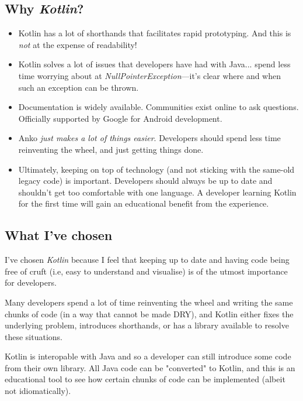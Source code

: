 \documentclass[a4paper]{article}
\begin{document}
\subsection{Why \emph{Kotlin}?}
\begin{itemize}
    \item Kotlin has a lot of shorthands that facilitates rapid prototyping. And this is \emph{not} at the expense of readability!\cite{whykotlin}
    \item Kotlin solves a lot of issues that developers have had with Java... spend less time worrying about at \emph{NullPointerException}---it's clear where and when such an exception can be thrown.
    \item Documentation is widely available. Communities exist online\cite{kotlincommunity} to ask questions. Officially supported by Google for Android development.
    \item Anko \emph{just makes a lot of things easier}. Developers should spend less time reinventing the wheel, and just getting things done.
    \item Ultimately, keeping on top of technology (and not sticking with the same-old legacy code) is important. Developers should always be up to date and shouldn't get too comfortable with one language. A developer learning Kotlin for the first time will gain an educational benefit from the experience.
\end{itemize}

\subsection{What I've chosen}
I've chosen \emph{Kotlin} because I feel that keeping up to date and having code being free of cruft (i.e, easy to understand and visualise) is of the utmost importance for developers.

Many developers spend a lot of time reinventing the wheel and writing the same chunks of code (in a way that cannot be made DRY), and Kotlin either fixes the underlying problem, introduces shorthands, or has a library available to resolve these situations.

Kotlin is interopable with Java\cite{javainterop} and so a developer can still introduce some code from their own library. All Java code can be "converted" to Kotlin\cite{javatokotlin}, and this is an educational tool to see how certain chunks of code can be implemented (albeit not idiomatically).
\pagebreak
\end{document}
